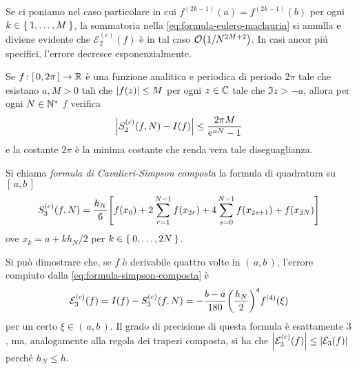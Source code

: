 	Se ci poniamo nel caso particolare in cui \(f^{(2 k -1)} (a) = f^{(2 k - 1)} (b)\) per ogni \(k \in \Set{1, \dots, M}\), la sommatoria nella \eqref{eq:formula-eulero-maclaurin} si annulla e diviene evidente che \(\mathcal{E}_2^{(c)} (f)\) è in tal caso \(\order{1 / N^{2 M + 2}}\). In casi ancor piú specifici, l'errore decresce esponenzialmente.
	
	\begin{teorema}
		Se \(f \colon [\, 0, 2 \pi \,] \to \mathbb{R}\) è una funzione analitica e periodica di periodo \(2 \pi\) tale che esistano \(a, M > 0\) tali che \(\abs{f (z)} \le M\) per ogni \(z \in \mathbb{C}\) tale che \(\Im z > - a\), allora per ogni \(N \in \mathbb{N}^*\) \(f\) verifica
		\begin{equation}
			\abs{S_2^{(c)} (f, N) - I (f)} \le \frac{2 \pi M}{\mathrm{e}\mkern1mu^{a N} - 1}
		\end{equation}
		e la costante \(2 \pi\) è la minima costante che renda vera tale diseguaglianza.
	\end{teorema}

	\begin{definizione}
		Si chiama \emph{formula di Cavalieri-Simpson composta} la formula di quadratura su \([\, a, b \,]\)
		\begin{equation}\label{eq:formula-simpson-composta}
			S_3^{(c)} (f, N) = \frac{h_N}{6} \qty[f (x_0) + 2 \sum_{r = 1}^{N - 1} f (x_{2 r}) + 4 \sum_{s = 0}^{N - 1} f (x_{2 s + 1}) + f (x_{2 N})]
		\end{equation}
		ove \(x_k = a + k h_N / 2\) per \(k \in \Set{0, \dots, 2 N}\).
	\end{definizione}

	Si può dimostrare che, se \(f\) è derivabile quattro volte in \((\, a, b \,)\), l'errore compiuto dalla \eqref{eq:formula-simpson-composta} è
	\begin{equation}
		\mathcal{E}_3^{(c)} (f) = I (f) - S_3^{(c)} (f, N) = - \frac{b - a}{180} \qty(\frac{h_N}{2})^4 f^{(4)} (\xi)
	\end{equation}
	per un certo \(\xi \in (\, a, b \,)\). Il grado di precisione di questa formula è esattamente \(3\), ma, analogamente alla regola dei trapezi composta, si ha che \(\abs{\mathcal{E}_3^{(c)} (f)} \le \abs{\mathcal{E}_3 (f)}\) perché \(h_N \le h\).
	
